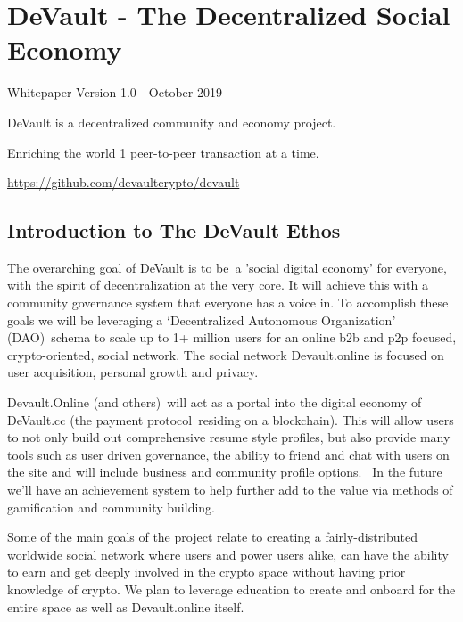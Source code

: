 \hypertarget{h.ehus4lru41jz}{%
\section{\texorpdfstring{{DeVault - The Decentralized Social
Economy}}{DeVault - The Decentralized Social Economy}}\label{h.ehus4lru41jz}}

{Whitepaper Version 1.0 - October 2019}

{DeVault is a decentralized community and economy project. }

{Enriching the world 1 peer-to-peer transaction at a time.}

{\href{https://www.google.com/url?q=https://github.com/devaultcrypto\&sa=D\&ust=1574537005289000}{https://github.com/devaultcrypto/devault}}

{}

\hypertarget{h.ijvkyqh5t7oc}{%
\subsection{\texorpdfstring{{Introduction to The DeVault
Ethos}}{Introduction to The DeVault Ethos}}\label{h.ijvkyqh5t7oc}}

{The overarching goal of DeVault is to be}{~a '}{social digital
economy}{' for everyone, with the spirit of decentralization at the very
core. It will achieve this with a community governance system that
everyone has a voice in. To accomplish these goals we will be leveraging
a `}{D}{ecentralized }{A}{utonomous }{O}{rganization' }{(DAO)}{~schema
to scale up to 1+ million users for an online b2b and p2p focused,
crypto-oriented, social network. The social network Devault.online is
focused on user acquisition, personal growth and privacy.}

{}

{Devault.Online }{(and others)}{~will act as a portal into the digital
economy of DeVault.cc (the }{payment protocol}{~residing on a
blockchain}{). This will allow users to not only build out comprehensive
resume style profiles, but also provide many tools such as user driven
governance, the ability to friend and chat with users on the site and
will include business and community profile options. ~In the future
we'll have an achievement system to help further add to the value via
methods of gamification and community building.}

{}

{Some of the main goals of the project relate to creating a
fairly-distributed worldwide social network where users and power users
alike, can have the ability to earn and get deeply involved in the
crypto space without having prior knowledge of crypto. We plan to
leverage education to create and onboard for the entire space as well as
Devault.online itself.}


